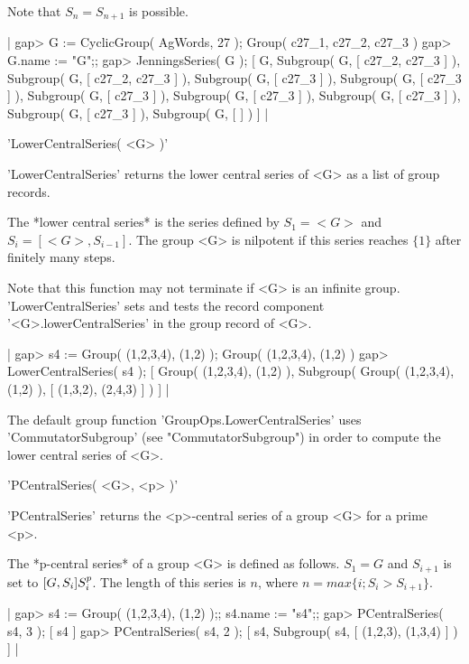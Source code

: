 Note that $S_n = S_{n+1}$ is possible.

|    gap> G := CyclicGroup( AgWords, 27 );
    Group( c27_1, c27_2, c27_3 )
    gap> G.name := "G";;
    gap> JenningsSeries( G );
    [ G, Subgroup( G, [ c27_2, c27_3 ] ), Subgroup( G, [ c27_2, c27_3 ] ),
      Subgroup( G, [ c27_3 ] ), Subgroup( G, [ c27_3 ] ),
      Subgroup( G, [ c27_3 ] ), Subgroup( G, [ c27_3 ] ),
      Subgroup( G, [ c27_3 ] ), Subgroup( G, [ c27_3 ] ),
      Subgroup( G, [  ] ) ] |


'LowerCentralSeries( <G> )'

'LowerCentralSeries' returns the lower central series of <G> as a list of
group records.

The  *lower central series*  is  the series defined  by  $S_1 = <G>$  and
$S_i = [  <G>, S_{i-1} ]$.   The group <G>  is  nilpotent  if this series
reaches $\{1\}$ after finitely many steps.

Note that  this function may not terminate  if <G> is an  infinite group.
'LowerCentralSeries'     sets  and  tests    the     record     component
'<G>.lowerCentralSeries' in the group record of <G>.

|    gap> s4 := Group( (1,2,3,4), (1,2) );
    Group( (1,2,3,4), (1,2) )
    gap> LowerCentralSeries( s4 );
    [ Group( (1,2,3,4), (1,2) ), Subgroup( Group( (1,2,3,4), (1,2) ), 
        [ (1,3,2), (2,4,3) ] ) ] |

The   default    group   function     'GroupOps.LowerCentralSeries'  uses
'CommutatorSubgroup' (see "CommutatorSubgroup")  in  order to compute the
lower central series of <G>.


'PCentralSeries( <G>, <p> )'

'PCentralSeries' returns the  <p>-central  series  of  a  group <G> for a
prime <p>.

The *p-central series* of a group  <G> is defined as  follows.  $S_1 = G$
and $S_{i+1}$ is set to $[G,S_i] \* S_i^p$.  The length of this series is
$n$, where $n = max\{ i ; S_i > S_{i+1} \}$.

|    gap> s4 := Group( (1,2,3,4), (1,2) );; s4.name := "s4";;
    gap> PCentralSeries( s4, 3 );
    [ s4 ]
    gap> PCentralSeries( s4, 2 );
    [ s4, Subgroup( s4, [ (1,2,3), (1,3,4) ] ) ] |

